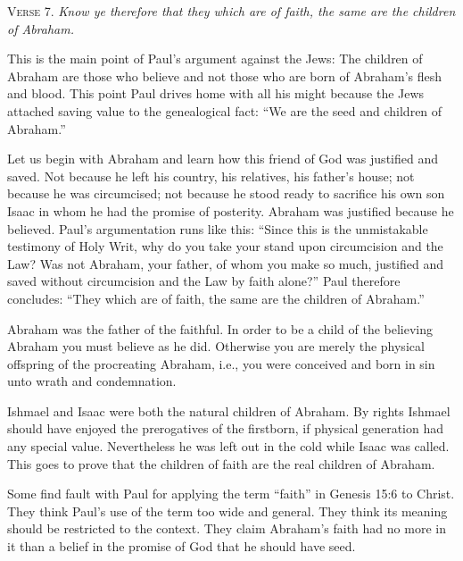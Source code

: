 \textsc{Verse} 7. \emph{Know ye therefore that they which are of faith, the same are the children of Abraham.}

This is the main point of Paul’s argument against the Jews: The children of Abraham are those who believe and not those who are born of Abraham’s flesh and blood. This point Paul drives home with all his might because the Jews attached saving value to the genealogical fact: “We are the seed and children of Abraham.”

Let us begin with Abraham and learn how this friend of God was justified and saved. Not because he left his country, his relatives, his father’s house; not because he was circumcised; not because he stood ready to sacrifice his own son Isaac in whom he had the promise of posterity. Abraham was justified because he believed. Paul’s argumentation runs like this: “Since this is the unmistakable testimony of Holy Writ, why do you take your stand upon circumcision and the Law? Was not Abraham, your father, of whom you make so much, justified and saved without circumcision and the Law by faith alone?” Paul therefore concludes: “They which are of faith, the same are the children of Abraham.”

Abraham was the father of the faithful. In order to be a child of the believing Abraham you must believe as he did. Otherwise you are merely the physical offspring of the procreating Abraham, i.e., you were conceived and born in sin unto wrath and condemnation.

Ishmael and Isaac were both the natural children of Abraham. By rights Ishmael should have enjoyed the prerogatives of the firstborn, if physical generation had any special value. Nevertheless he was left out in the cold while Isaac was called. This goes to prove that the children of faith are the real children of Abraham.

Some find fault with Paul for applying the term “faith” in Genesis 15:6 to Christ. They think Paul’s use of the term too wide and general. They think its meaning should be restricted to the context. They claim Abraham’s faith had no more in it than a belief in the promise of God that he should have seed.

